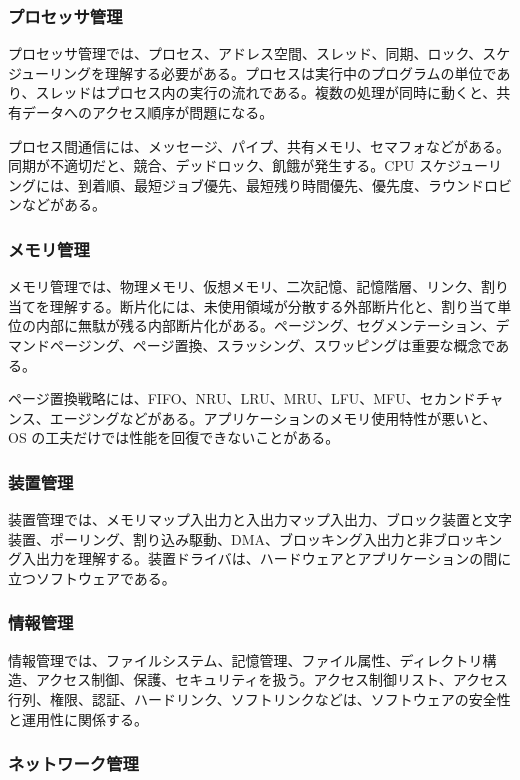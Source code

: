 \documentclass[a4paper,11pt]{ltjsarticle}
\numberwithin{figure}{section}
\numberwithin{table}{section}
\begin{document}
\subsubsection{プロセッサ管理}

プロセッサ管理では、プロセス、アドレス空間、スレッド、同期、ロック、スケジューリングを理解する必要がある。プロセスは実行中のプログラムの単位であり、スレッドはプロセス内の実行の流れである。複数の処理が同時に動くと、共有データへのアクセス順序が問題になる。

プロセス間通信には、メッセージ、パイプ、共有メモリ、セマフォなどがある。同期が不適切だと、競合、デッドロック、飢餓が発生する。CPU スケジューリングには、到着順、最短ジョブ優先、最短残り時間優先、優先度、ラウンドロビンなどがある。

\subsubsection{メモリ管理}

メモリ管理では、物理メモリ、仮想メモリ、二次記憶、記憶階層、リンク、割り当てを理解する。断片化には、未使用領域が分散する外部断片化と、割り当て単位の内部に無駄が残る内部断片化がある。ページング、セグメンテーション、デマンドページング、ページ置換、スラッシング、スワッピングは重要な概念である。

ページ置換戦略には、FIFO、NRU、LRU、MRU、LFU、MFU、セカンドチャンス、エージングなどがある。アプリケーションのメモリ使用特性が悪いと、OS の工夫だけでは性能を回復できないことがある。

\subsubsection{装置管理}

装置管理では、メモリマップ入出力と入出力マップ入出力、ブロック装置と文字装置、ポーリング、割り込み駆動、DMA、ブロッキング入出力と非ブロッキング入出力を理解する。装置ドライバは、ハードウェアとアプリケーションの間に立つソフトウェアである。

\subsubsection{情報管理}

情報管理では、ファイルシステム、記憶管理、ファイル属性、ディレクトリ構造、アクセス制御、保護、セキュリティを扱う。アクセス制御リスト、アクセス行列、権限、認証、ハードリンク、ソフトリンクなどは、ソフトウェアの安全性と運用性に関係する。

\subsubsection{ネットワーク管理}
\end{document}
